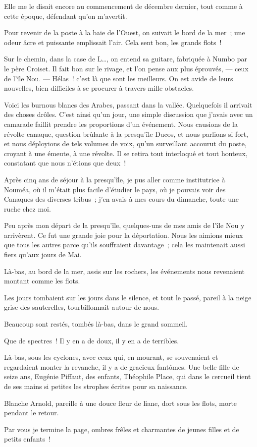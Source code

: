 \documentclass[french,twoside]{book} %
\newcommand\chapterclose{} %
\begin{document}
Elle me le disait encore au commencement de décembre dernier, tout comme à cette époque, défendant qu’on m’avertit.\par
Pour revenir de la poste à la baie de l’Ouest, on suivait le bord de la mer ; une odeur âcre et puissante emplissait l’air. Cela sent bon, les grands flots !\par
Sur le chemin, dans la case de L…, on entend sa guitare, fabriquée à Numbo par le père Croiset. Il fait bon sur le rivage, et l’on pense aux plus éprouvés, — ceux de l’île Nou. — Hélas ! c’est là que sont les meilleurs. On est avide de leurs nouvelles, bien difficiles à se procurer à travers mille obstacles.\par
Voici les burnous blancs des Arabes, passant dans la vallée. Quelquefois il arrivait des choses drôles. C’est ainsi qu’un jour, une simple discussion  que j’avais avec un camarade faillit prendre les proportions d’un événement. Nous causions de la révolte canaque, question brûlante à la presqu’île Ducos, et nous parlions si fort, et nous déployions de tels volumes de voix, qu’un surveillant accourut du poste, croyant à une émeute, à une révolte. Il se retira tout interloqué et tout honteux, constatant que nous n’étions que deux !\par
Après cinq ans de séjour à la presqu’île, je pus aller comme institutrice à Nouméa, où il m’était plus facile d’étudier le pays, où je pouvais voir des Canaques des diverses tribus ; j’en avais à mes cours du dimanche, toute une ruche chez moi.\par
Peu après mon départ de la presqu’île, quelques-uns de mes amis de l’île Nou y arrivèrent. Ce fut une grande joie pour la déportation. Nous les aimions mieux que tous les autres parce qu’ils souffraient davantage ; cela les maintenait aussi fiers qu’aux jours de Mai.\par
Là-bas, au bord de la mer, assis sur les rochers, les événements nous revenaient montant comme les flots.\par
Les jours tombaient sur les jours dans le silence, et tout le passé, pareil à la neige grise des sauterelles, tourbillonnait autour de nous.\par
 Beaucoup sont restés, tombés là-bas, dans le grand sommeil.\par
Que de spectres ! Il y en a de doux, il y en a de terribles.\par
Là-bas, sous les cyclones, avec ceux qui, en mourant, se souvenaient et regardaient monter la revanche, il y a de gracieux fantômes. Une belle fille de seize ans, Eugénie Piffaut, des enfants, Théophile Place, qui dans le cercueil tient de ses mains si petites les strophes écrites pour sa naissance.\par
Blanche Arnold, pareille à une douce fleur de liane, dort sous les flots, morte pendant le retour.\par
Par vous je termine la page, ombres frêles et charmantes de jeunes filles et de petits enfants !
\chapterclose
\end{document}
